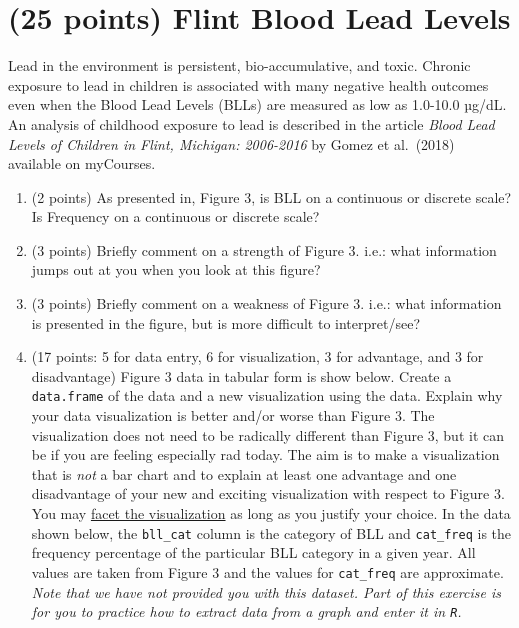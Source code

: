 \documentclass[letterpaper,12pt,twoside,]{pinp}
\begin{document}
\newpage

\hypertarget{points-flint-blood-lead-levels}{%
\section{(25 points) Flint Blood Lead
Levels}\label{points-flint-blood-lead-levels}}

Lead in the environment is persistent, bio-accumulative, and toxic.
Chronic exposure to lead in children is associated with many negative
health outcomes even when the Blood Lead Levels (BLLs) are measured as
low as 1.0-10.0 µg/dL. An analysis of childhood exposure to lead is
described in the article \emph{Blood Lead Levels of Children in Flint,
Michigan: 2006-2016} by Gomez et al.~(2018) available on myCourses.

\begin{enumerate}
\def\labelenumi{\alph{enumi})}
\item
  (2 points) As presented in, Figure 3, is BLL on a continuous or
  discrete scale? Is Frequency on a continuous or discrete scale?
\item
  (3 points) Briefly comment on a strength of Figure 3. i.e.: what
  information jumps out at you when you look at this figure?
\item
  (3 points) Briefly comment on a weakness of Figure 3. i.e.: what
  information is presented in the figure, but is more difficult to
  interpret/see?
\item
  (17 points: 5 for data entry, 6 for visualization, 3 for advantage,
  and 3 for disadvantage) Figure 3 data in tabular form is show below.
  Create a \texttt{data.frame} of the data and a new visualization using
  the data. Explain why your data visualization is better and/or worse
  than Figure 3. The visualization does not need to be radically
  different than Figure 3, but it can be if you are feeling especially
  rad today. The aim is to make a visualization that is \emph{not} a bar
  chart and to explain at least one advantage and one disadvantage of
  your new and exciting visualization with respect to Figure 3. You may
  \href{https://ggplot2.tidyverse.org/reference/facet_grid.html}{facet
  the visualization} as long as you justify your choice. In the data
  shown below, the \texttt{bll\_cat} column is the category of BLL and
  \texttt{cat\_freq} is the frequency percentage of the particular BLL
  category in a given year. All values are taken from Figure 3 and the
  values for \texttt{cat\_freq} are approximate. \emph{Note that we have
  not provided you with this dataset. Part of this exercise is for you
  to practice how to extract data from a graph and enter it in
  \texttt{R}.}
\end{enumerate}
\end{document}
